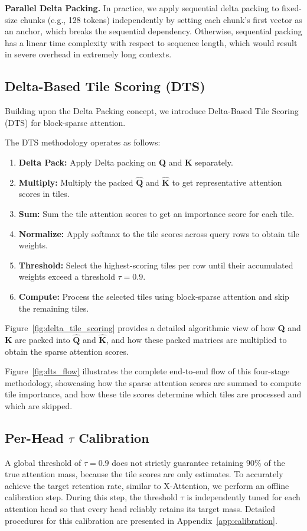 \textbf{Parallel Delta Packing.}
In practice, we apply sequential delta packing to fixed-size chunks (e.g., 128 tokens) independently by setting each chunk's first vector as an anchor, which breaks the sequential dependency. Otherwise, sequential packing has a linear time complexity with respect to sequence length, which would result in severe overhead in extremely long contexts.



\subsection{Delta-Based Tile Scoring (DTS)}
Building upon the Delta Packing concept, we introduce Delta-Based Tile Scoring (DTS) for block-sparse attention. 

The DTS methodology operates as follows:
\begin{enumerate}
    \item \textbf{Delta Pack:} Apply Delta packing on \textbf{Q} and \textbf{K} separately.
    \item \textbf{Multiply:} Multiply the packed $\hat{\textbf{Q}}$ and $\hat{\textbf{K}}$ to get representative attention scores in tiles.
    \item \textbf{Sum:} Sum the tile attention scores to get an importance score for each tile.
    \item \textbf{Normalize:} Apply softmax to the tile scores across query rows to obtain tile weights.
    \item \textbf{Threshold:} Select the highest-scoring tiles per row until their accumulated weights exceed a threshold $\tau = 0.9$.
    \item \textbf{Compute:} Process the selected tiles using block-sparse attention and skip the remaining tiles.
\end{enumerate}



Figure~\ref{fig:delta_tile_scoring} provides a detailed algorithmic view of how \textbf{Q} and \textbf{K} are packed into $\hat{\textbf{Q}}$ and $\hat{\textbf{K}}$, and how these packed matrices are multiplied to obtain the sparse attention scores.

Figure~\ref{fig:dts_flow} illustrates the complete end-to-end flow of this four-stage methodology, showcasing how the sparse attention scores are summed to compute tile importance, and how these tile scores determine which tiles are processed and which are skipped.



\subsection{Per-Head $\tau$ Calibration}
A global threshold of $\tau=0.9$ does not strictly guarantee retaining $90\%$ of the true attention mass, because the tile scores are only estimates. To accurately achieve the target retention rate, similar to X-Attention, we perform an offline calibration step. During this step, the threshold $\tau$ is independently tuned for each attention head so that every head reliably retains its target mass. Detailed procedures for this calibration are presented in Appendix~\ref{app:calibration}.
